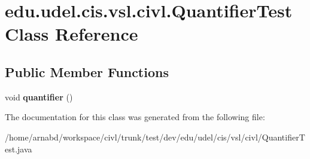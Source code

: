 \hypertarget{classedu_1_1udel_1_1cis_1_1vsl_1_1civl_1_1QuantifierTest}{}\section{edu.\+udel.\+cis.\+vsl.\+civl.\+Quantifier\+Test Class Reference}
\label{classedu_1_1udel_1_1cis_1_1vsl_1_1civl_1_1QuantifierTest}
\subsection*{Public Member Functions}
\begin{DoxyCompactItemize}
\item 
\hypertarget{classedu_1_1udel_1_1cis_1_1vsl_1_1civl_1_1QuantifierTest_ab0031f4768c197e6db77b2114ff59ebd}{}void {\bfseries quantifier} ()\label{classedu_1_1udel_1_1cis_1_1vsl_1_1civl_1_1QuantifierTest_ab0031f4768c197e6db77b2114ff59ebd}

\end{DoxyCompactItemize}


The documentation for this class was generated from the following file\+:\begin{DoxyCompactItemize}
\item 
/home/arnabd/workspace/civl/trunk/test/dev/edu/udel/cis/vsl/civl/Quantifier\+Test.\+java\end{DoxyCompactItemize}
